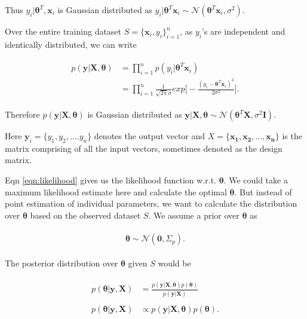 \documentclass[english]{tktltiki}
\begin{document}
Thus $y_i|\boldsymbol\theta ^T, \mathbf{x}_i$ is Gaussian distributed as $y_i | \boldsymbol\theta ^T \mathbf{x}_i \sim \mathcal{N}(\boldsymbol\theta^T \mathbf{x}_i, \sigma^2).
$

Over the entire training dataset $S = \{\mathbf{x}_i, y_i\}_{i=1}^n$, as $y_i$'s are independent and identically distributed, we can write

\begin{eqnarray}
\label{eqn:likelihood}
\begin{split}
	p(\mathbf{y} | \mathbf{X}, \boldsymbol\theta) &= \prod_{i = 1}^n p(y_i | \boldsymbol\theta ^T \mathbf{x}_i) \\
	&= \prod_{i = 1}^n \frac{1}{\sqrt{2 \pi} \sigma} exp \Big[-\frac{(y_i - \boldsymbol\theta ^T \mathbf{x}_i)^2}{2 \sigma^2} \Big].
\end{split}
\end{eqnarray}

Therefore $p(\mathbf{y} | \mathbf{X}, \boldsymbol\theta)$ is Gaussian distributed as $\mathbf{y} | \mathbf{X}, \boldsymbol\theta \sim \mathcal{N}(\boldsymbol\theta^T \mathbf{X}, \sigma^2 \mathbf{I})$.

Here $\mathbf{y}_i = \{y_1, y_2, .... y_n\}$ denotes the output vector and $X = \{\mathbf{x_1}, \mathbf{x_2}, ..., \mathbf{x_n}\}$ is the matrix comprising of all the input vectors, sometimes denoted as the design matrix.



Eqn \ref{eqn:likelihood} gives us the likelihood function w.r.t. $\boldsymbol \theta$. We could take a maximum likelihood estimate here and calculate the optimal $\boldsymbol \theta$. But instead of point estimation of individual parameters, we want to calculate the distribution over $\boldsymbol \theta$ based on the observed dataset $S$. We assume a prior over $\boldsymbol \theta$ as

\begin{eqnarray}
\label{eqn:prior}
\begin{split}
	\boldsymbol \theta \sim \mathcal{N}(\mathbf{0}, \Sigma_p).
\end{split}
\end{eqnarray}

The posterior distribution over $\boldsymbol \theta$ given $S$ would be

\begin{eqnarray}
\begin{split}
p(\boldsymbol \theta | \mathbf{y}, \mathbf{X}) &= \frac{p(\mathbf{y} | \mathbf{X}, \boldsymbol\theta) p(\boldsymbol \theta)}{p(\mathbf{y} | \mathbf{X})} \\
&~\\
p(\boldsymbol \theta | \mathbf{y}, \mathbf{X}) & \propto p(\mathbf{y} | \mathbf{X}, \boldsymbol\theta) p(\boldsymbol \theta).
\end{split}
\end{eqnarray}
\end{document}
